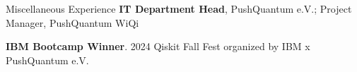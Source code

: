 \begin{rubric}{Miscellaneous Experience}
	\textbf{IT Department Head}, PushQuantum e.V.; Project Manager, PushQuantum WiQi

	\entry*[Nov. 2024] \textbf{IBM Bootcamp Winner}. 2024 Qiskit Fall Fest organized by IBM x PushQuantum e.V.

\end{rubric}
